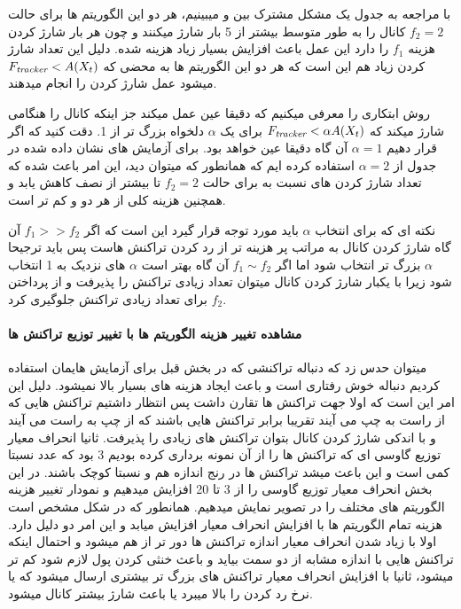 با مراجعه به جدول   یک مشکل مشترک بین \on  و \oni میبینیم، هر دو این الگوریتم ها برای حالت 
$f_2=2$
کانال را به طور متوسط بیشتر از 5 بار شارژ میکنند و چون هر بار شارژ کردن هزینه
$f_1$
را دارد این عمل باعث افزایش بسیار زیاد هزینه شده. دلیل این تعداد شارژ کردن زیاد هم این است که هر دو این الگوریتم ها به محضی که
$F_{\textit{tracker}} < A(X_t)$
میشود عمل شارژ کردن را انجام میدهند.

روش ابتکاری \onii را معرفی میکنیم که دقیقا عین \oni عمل میکند جز اینکه کانال را هنگامی شارژ میکند که
$F_{\textit{tracker}} < \alpha A(X_t)$
برای یک $\alpha$ دلخواه بزرگ تر از 1. دقت کنید که اگر قرار دهیم 
$\alpha =1$
آن گاه \onii دقیقا عین \oni خواهد بود. برای آزمایش های نشان داده شده در جدول   از 
$\alpha =2$
استفاده کرده ایم که همانطور که میتوان دید، این امر باعث شده که تعداد شارژ کردن های \onii نسبت به \oni برای حالت
$f_2=2$
تا بیشتر از نصف کاهش یابد و همچنین هزینه کلی \onii 
از هر دو \on و \oni کم تر است.

نکته ای که برای انتخاب
$\alpha$
باید مورد توجه قرار گیرد این است که اگر 
$f_1 >> f_2$
آن گاه شارژ کردن کانال به مراتب پر هزینه تر از رد کردن تراکنش هاست پس باید ترجیحا
$\alpha$
بزرگ تر انتخاب شود اما اگر 
$f_1 \sim f_2$
آن گاه بهتر است 
$\alpha$
های نزدیک به 1 انتخاب شود زیرا با یکبار شارژ کردن کانال میتوان تعداد زیادی تراکنش را پذیرفت و از پرداختن 
$f_2$
برای تعداد زیادی تراکنش جلوگیری کرد.\\




\paragraph{مشاهده تغییر هزینه الگوریتم ها با تغییر توزیع تراکنش ها}
میتوان حدس زد که دنباله تراکنشی که در بخش قبل برای آزمایش هایمان استفاده کردیم دنباله خوش رفتاری است و باعث ایجاد هزینه های بسیار بالا نمیشود. دلیل این امر این است که اولا جهت تراکنش ها تقارن داشت پس انتظار داشتیم تراکنش هایی که از راست به چپ می آیند تقریبا برابر تراکنش هایی باشند که از چپ به راست می آیند و با اندکی شارژ کردن کانال بتوان تراکنش های زیادی را پذیرفت. ثانیا انحراف معیار توزیع گاوسی ای که تراکنش ها را از آن نمونه برداری کرده بودیم 3 بود که عدد نسبتا کمی است و این باعث میشد تراکنش ها در رنج اندازه هم و نسبتا کوچک باشند.
در این بخش انحراف معیار توزیع گاوسی را از 3 تا 20 افزایش میدهیم و نمودار تغییر هزینه الگوریتم های مختلف را در تصویر  نمایش میدهیم. 
همانطور که در شکل مشخص است هزینه تمام الگوریتم ها با افزایش انحراف معیار افزایش میابد و این امر دو دلیل دارد. اولا با زیاد شدن انحراف معیار اندازه تراکنش ها دور تر از هم میشود و احتمال اینکه تراکنش هایی با اندازه مشابه از دو سمت بیاید و باعث خنثی کردن پول لازم شود کم تر میشود، ثانیا با افزایش انحراف معیار تراکنش های بزرگ تر بیشتری ارسال میشود که یا نرخ رد کردن را بالا میبرد یا باعث شارژ بیشتر کانال میشود.

